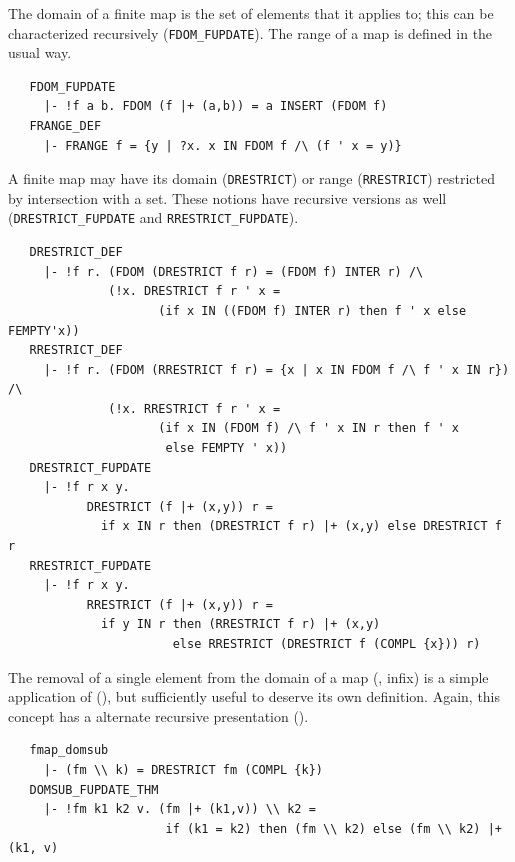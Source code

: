 {The domain of a finite map is the set of elements that it applies to;
this can be characterized recursively
({\small\verb+FDOM_FUPDATE+}). The range of a map is defined in the
usual way.
\begin{hol}
\begin{verbatim}
   FDOM_FUPDATE
     |- !f a b. FDOM (f |+ (a,b)) = a INSERT (FDOM f)
   FRANGE_DEF
     |- FRANGE f = {y | ?x. x IN FDOM f /\ (f ' x = y)}
\end{verbatim}
\end{hol}
%
A finite map may have its domain ({\small\verb+DRESTRICT+})
or range ({\small\verb+RRESTRICT+}) restricted by intersection with a
set. These notions have recursive versions as well
({\small\verb+DRESTRICT_FUPDATE+} and {\small\verb+RRESTRICT_FUPDATE+}).
%
\begin{hol}
\begin{verbatim}
   DRESTRICT_DEF
     |- !f r. (FDOM (DRESTRICT f r) = (FDOM f) INTER r) /\
              (!x. DRESTRICT f r ' x =
                     (if x IN ((FDOM f) INTER r) then f ' x else FEMPTY'x))
   RRESTRICT_DEF
     |- !f r. (FDOM (RRESTRICT f r) = {x | x IN FDOM f /\ f ' x IN r}) /\
              (!x. RRESTRICT f r ' x =
                     (if x IN (FDOM f) /\ f ' x IN r then f ' x
                      else FEMPTY ' x))
   DRESTRICT_FUPDATE
     |- !f r x y.
           DRESTRICT (f |+ (x,y)) r =
             if x IN r then (DRESTRICT f r) |+ (x,y) else DRESTRICT f r
   RRESTRICT_FUPDATE
     |- !f r x y.
           RRESTRICT (f |+ (x,y)) r =
             if y IN r then (RRESTRICT f r) |+ (x,y)
                       else RRESTRICT (DRESTRICT f (COMPL {x})) r)
\end{verbatim}
\end{hol}
The removal of a single element from the domain of a map
(\holtxt{\bs\bs}, infix) is a simple application of
(\holtxt{DRESTRICT}), but sufficiently useful to deserve its own
definition. Again, this concept has a alternate recursive presentation
(\holtxt{DOMSUB\_FUPDATE\_THM}).
%
\begin{hol}
\begin{verbatim}
   fmap_domsub
     |- (fm \\ k) = DRESTRICT fm (COMPL {k})
   DOMSUB_FUPDATE_THM
     |- !fm k1 k2 v. (fm |+ (k1,v)) \\ k2 =
                      if (k1 = k2) then (fm \\ k2) else (fm \\ k2) |+ (k1, v)
\end{verbatim}
\end{hol}

}
